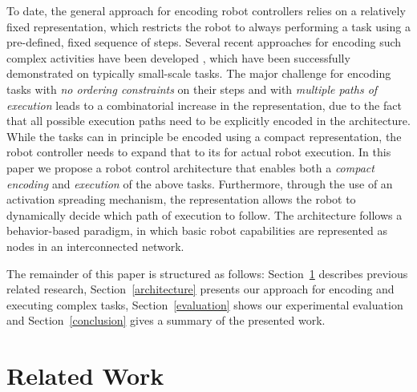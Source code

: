 \documentclass[conference]{article}
\begin{document}
To date, the general approach for encoding robot controllers relies on a relatively fixed representation, which restricts the robot to always performing a task using a pre-defined, fixed sequence of steps. Several recent approaches for encoding such complex activities have been developed \cite{koppula2013anticipating}\cite{hawkins2014anticipating}, which have been successfully demonstrated on typically small-scale tasks. The major challenge for encoding tasks with {\it no ordering constraints} on their steps and with {\it multiple paths of execution} leads to a combinatorial increase in the representation, due to the fact that all possible execution paths need to be explicitly encoded in the architecture. While the tasks can in principle be encoded using a compact representation, the robot controller needs to expand that to its for actual robot execution. In this paper we propose a robot control architecture that enables both a {\it compact encoding} and {\it execution} of the above tasks. Furthermore, through the use of an activation spreading mechanism, the representation allows the robot to dynamically decide which path of execution to follow. The architecture follows a behavior-based paradigm, in which basic robot capabilities are represented as nodes in an interconnected network. 

The remainder of this paper is structured as follows: Section~\ref{relatedWork} describes previous related research, Section~\ref{architecture} presents our approach for encoding and executing complex tasks, Section~\ref{evaluation} shows our experimental evaluation and Section~\ref{conclusion} gives a summary of the presented work.

\section{Related Work}
\label{relatedWork}
\end{document}
